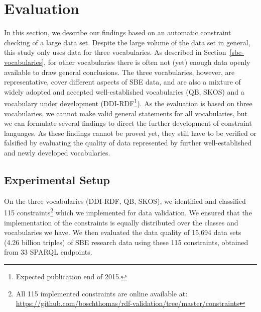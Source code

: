 \documentclass[conference]{IEEEtran}
\newcommand{\ke}[1]{\todo[size=\small, color=red!40]{\textbf{Kai:} #1}}
\begin{document}
\section{Evaluation}
\label{evaluation}

In this section, we describe our findings based on an automatic constraint checking of a large data set. Despite the large volume of the data set in general, this study only uses data for three vocabularies. As described in Section~\ref{sbe-vocabularies}, for other vocabularies there is often not (yet) enough data openly available to draw general conclusions. The three vocabularies, however, are representative, cover different aspects of SBE data, and are also a mixture of widely adopted and accepted well-established vocabularies (QB, SKOS) and a vocabulary under development (DDI-RDF\footnote{Expected publication end of 2015.}). 
As the evaluation is based on three vocabularies, 
we cannot make valid general statements for all vocabularies,
but we can formulate several findings to direct the further development of constraint languages.
As these findings cannot be proved yet, 
they still have to be verified or falsified
by evaluating the quality of data represented by further well-established and newly developed vocabularies.

\subsection{Experimental Setup}
\label{implementation}


On the three vocabularies (DDI-RDF, QB, SKOS), we identified and classified 115 constraints\footnote{All 115 implemented constraints are online available at: \url{https://github.com/boschthomas/rdf-validation/tree/master/constraints}} which we implemented for data validation. We ensured that the implementation of the constraints is equally distributed over the classes and vocabularies we have. We then evaluated the data quality of 15,694 data sets (4.26 billion triples) of SBE research data using these 115 constraints, obtained from 33 SPARQL endpoints.
\end{document}
